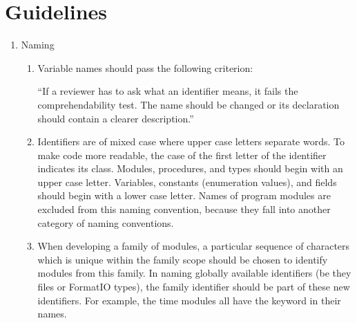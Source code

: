 \section{Guidelines}
\begin{enumerate}
\item
    Naming
    \begin{enumerate}
    \item
        Variable names should pass the following criterion:

        ``If a reviewer has to ask what an identifier means, 
        it fails the comprehendability test.  The name should be changed 
        or its declaration should contain a clearer description.''
    \item
        Identifiers are of mixed case where upper case letters
        separate words.  To make code more readable, the case of the first 
        letter of the identifier indicates its class.  
        Modules, procedures, and types should begin with an upper case letter.
        Variables, constants (enumeration values), and fields should begin
        with a lower case letter.  Names of program modules are excluded 
        from this naming convention, because they fall into another category
        of naming conventions.
    \item
        When developing a family of modules, a particular 
        sequence of characters which is unique within the family scope should
        be chosen to identify modules from this family.  In naming globally
        available identifiers (be they files or FormatIO types), the family
        identifier should be part of these new identifiers.  For example,
	the time modules all have the keyword  in their names.


\end{enumerate}
\end{enumerate}
